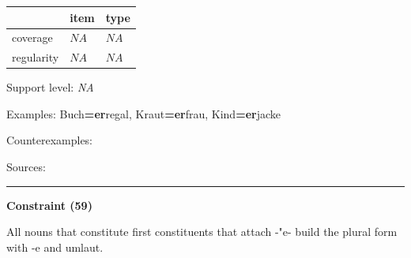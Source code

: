 \vspace{-0.25em}

\begin{table}[!ht]
\begin{center}
\setlength{\extrarowheight}{1pt}
\begin{tabularx}{\columnwidth}{|X|X|X|}
\hline
 & item & type \\
\hline
 coverage & $NA$ & $NA$ \\
\hline
 regularity & $NA$ & $NA$ \\
\hline
\end{tabularx}
\end{center}
\end{table}

\vspace{-1.35em}

\noindent
Support level: \textit{NA}

\vspace{0.3em}

\noindent
Examples: Buch\textbf{=er}regal, Kraut\textbf{=er}frau, Kind\textbf{=er}jacke

\noindent
Counterexamples: 

\vspace{0.3em}

\noindent
Sources: \citet[98]{ortner_mueller-bollhagen_1991}

\vspace{0.35em}
\hrule




\vspace{0.4em}

\begin{center}
\textbf{Constraint (59)}
\end{center}

\noindent
All nouns that constitute first constituents that attach -"e- build the plural form with -e and umlaut.
\vspace{0.5em}


